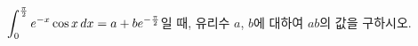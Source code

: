 $\displaystyle\int_{0}^{\frac{\pi}{2}}e^{-x}\cos x\mkern3mu dx=a+be^{-\frac{\pi}{2}}$일 때, 유리수 $a$, $b$에 대하여 $ab$의 값을 구하시오.
